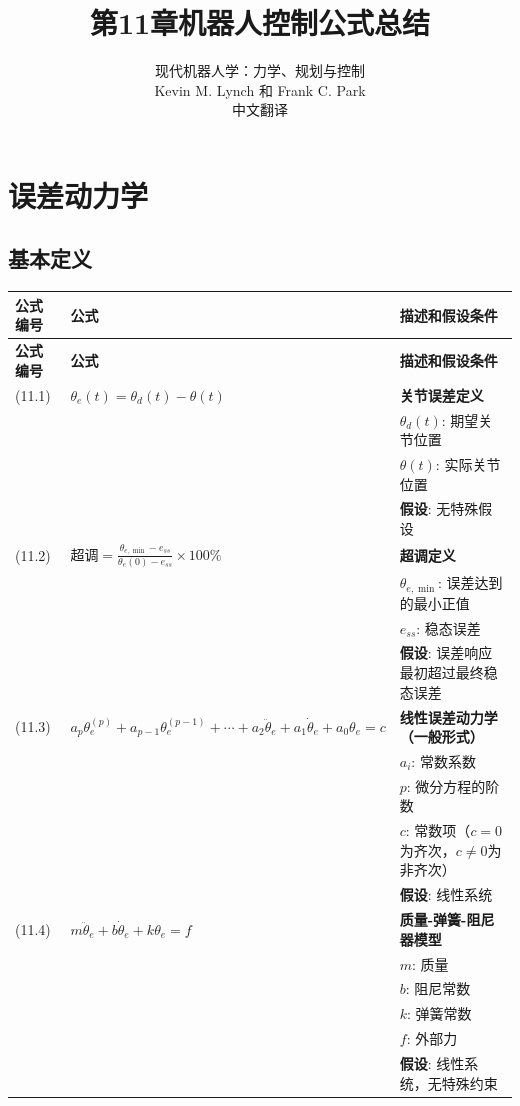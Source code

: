 \documentclass[12pt,a4paper]{article}
\title{第11章\quad 机器人控制公式总结}
\author{现代机器人学：力学、规划与控制\\
Kevin M. Lynch 和 Frank C. Park\\
中文翻译}
\date{}
\begin{document}
\maketitle

\tableofcontents
\newpage

\section{误差动力学}

\subsection{基本定义}

\begin{longtable}{|p{}|p{}|p{}|}
\hline
\textbf{公式编号} & \textbf{公式} & \textbf{描述和假设条件} \\
\hline
\endfirsthead
\hline
\textbf{公式编号} & \textbf{公式} & \textbf{描述和假设条件} \\
\hline
\endhead
\hline
\endfoot
\hline
\endlastfoot

(11.1) & $\theta_e(t) = \theta_d(t) - \theta(t)$ & 
\textbf{关节误差定义} \\
& & $\theta_d(t)$: 期望关节位置 \\
& & $\theta(t)$: 实际关节位置 \\
& & \textbf{假设}: 无特殊假设 \\
\hline

(11.2) & $\text{超调} = \frac{\theta_{e,\min} - e_{ss}}{\theta_e(0) - e_{ss}} \times 100\%$ & 
\textbf{超调定义} \\
& & $\theta_{e,\min}$: 误差达到的最小正值 \\
& & $e_{ss}$: 稳态误差 \\
& & \textbf{假设}: 误差响应最初超过最终稳态误差 \\
\hline

(11.3) & $a_p \theta_e^{(p)} + a_{p-1} \theta_e^{(p-1)} + \cdots + a_2 \ddot{\theta}_e + a_1 \dot{\theta}_e + a_0 \theta_e = c$ & 
\textbf{线性误差动力学（一般形式）} \\
& & $a_i$: 常数系数 \\
& & $p$: 微分方程的阶数 \\
& & $c$: 常数项（$c=0$为齐次，$c \neq 0$为非齐次） \\
& & \textbf{假设}: 线性系统 \\
\hline

(11.4) & $m\ddot{\theta}_e + b\dot{\theta}_e + k\theta_e = f$ & 
\textbf{质量-弹簧-阻尼器模型} \\
& & $m$: 质量 \\
& & $b$: 阻尼常数 \\
& & $k$: 弹簧常数 \\
& & $f$: 外部力 \\
& & \textbf{假设}: 线性系统，无特殊约束 \\
\hline


\end{longtable}
\end{document}
